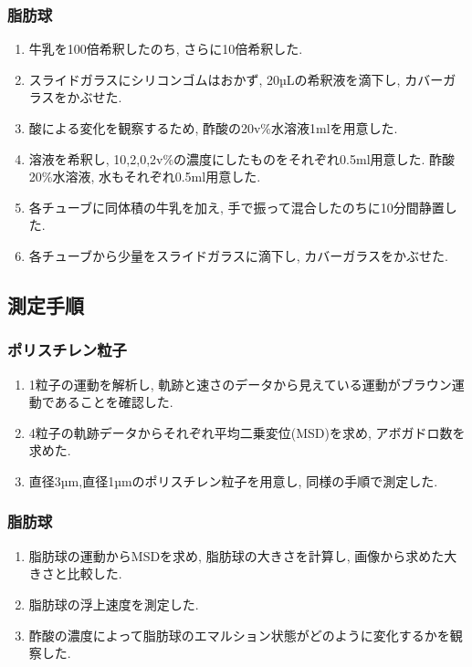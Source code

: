\documentclass[11pt]{ltjsarticle}
\begin{document}
    \subsubsection*{脂肪球}
      \begin{enumerate}
        \item 牛乳を100倍希釈したのち, さらに10倍希釈した. 
        \item スライドガラスにシリコンゴムはおかず, 20µLの希釈液を滴下し, カバーガラスをかぶせた.
        \item 酸による変化を観察するため, 酢酸の20v\%水溶液1mlを用意した.
        \item 溶液を希釈し, 10,2,0,2v\%の濃度にしたものをそれぞれ0.5ml用意した. 酢酸20\%水溶液, 水もそれぞれ0.5ml用意した.
        \item 各チューブに同体積の牛乳を加え, 手で振って混合したのちに10分間静置した. 
        \item 各チューブから少量をスライドガラスに滴下し, カバーガラスをかぶせた.
      \end{enumerate}
    \subsection*{測定手順}
      \subsubsection*{ポリスチレン粒子}
        \begin{enumerate}
          \item 1粒子の運動を解析し, 軌跡と速さのデータから見えている運動がブラウン運動であることを確認した.
          \item 4粒子の軌跡データからそれぞれ平均二乗変位(MSD)を求め, アボガドロ数を求めた.
          \item 直径3µm,直径1µmのポリスチレン粒子を用意し, 同様の手順で測定した.
        \end{enumerate}
      \subsubsection*{脂肪球}
        \begin{enumerate}
          \item 脂肪球の運動からMSDを求め, 脂肪球の大きさを計算し, 画像から求めた大きさと比較した.
          \item 脂肪球の浮上速度を測定した.
          \item 酢酸の濃度によって脂肪球のエマルション状態がどのように変化するかを観察した.
        \end{enumerate}
\end{document}
